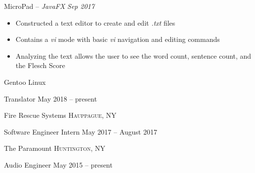 \documentclass[10pt,letterpaper]{article} %
\begin{document}
\headedsection 
{MicroPad -- \textit{JavaFX}}
{\textit{Sep 2017}} {
\begin{itemize}
	\setlength\itemsep{-0.3em}
	\item Constructed a text editor to create and edit \textit{.txt} files
	\item Contains a \textit{vi} mode with basic \textit{vi} navigation and editing commands
	\item Analyzing the text allows the user to see the word count, sentence count, and the Flesch Score
\end{itemize}
}


\spacedhrule{0em}{-0.9em} 



\headedsection
{Gentoo Linux}
{} {

\headedsubsection
{Translator}
{May 2018 -- present}
{}
}


\headedsection 
{Fire Rescue Systems}
{\textsc{Hauppague, NY}} {

\headedsubsection
{Software Engineer Intern}
{May 2017 -- August 2017}
{}
}


\headedsection 
{The Paramount}
{\textsc{Huntington, NY}} {

\headedsubsection 
{Audio Engineer}
{May 2015 -- present}
{}
}


\spacedhrule{0em}{-0.9em} 

\end{document}
